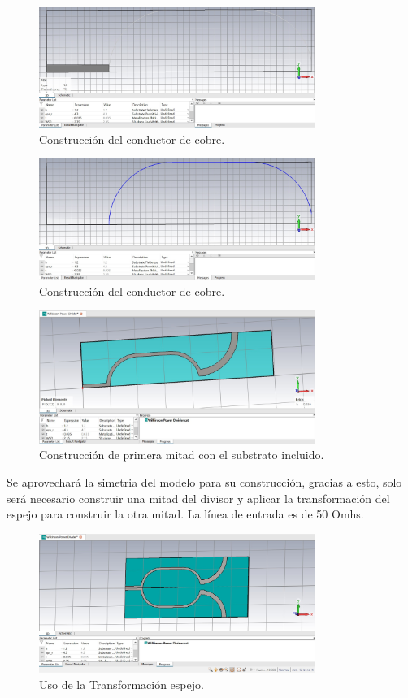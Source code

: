 \documentclass[a4paper]{IEEEtran} %
\begin{document}
\begin{figure}[h]    
    \centering
        \includegraphics[width=9cm]{imagenes/img6}
        \caption{Construcción del conductor de cobre.}
        \label{fig:modelamiento1}
\end{figure} 
\vspace{50mm}
\begin{figure}[h]    
    \centering
        \includegraphics[width=9cm]{imagenes/img7}
        \caption{Construcción del conductor de cobre.}
        \label{fig:modelamiento2}
\end{figure} 
\begin{figure}[h]    
    \centering
        \includegraphics[width=9cm]{imagenes/img8}
        \caption{Construcción de primera mitad con el substrato incluido.}
        \label{fig:modelamiento3}
\end{figure} 

Se aprovechará la simetria del modelo para su construcción, gracias a esto, solo será necesario construir una mitad del divisor y aplicar la transformación del espejo para construir la otra mitad. La línea de entrada es de 50 Omhs. 
\begin{figure}[h]    
    \centering
    \includegraphics[width=9cm]{imagenes/img9}
    \caption{Uso de la Transformación espejo.}
    \label{fig:modelamiento4}
\end{figure} 
\end{document}
